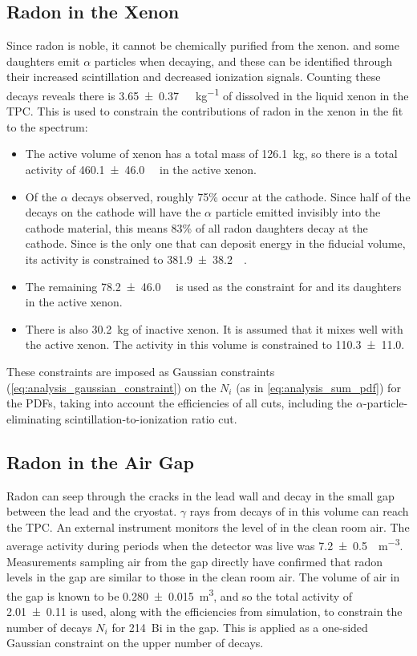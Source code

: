 \documentclass[herrin-thesis.tex]{subfiles}
\begin{document}
\subsection{Radon in the Xenon}
Since radon is noble, it cannot be chemically purified from the xenon.  and some daughters emit \(\alpha\) particles when decaying, and these can be identified through their increased scintillation and decreased ionization signals. Counting these decays reveals there is \SI{3.65\pm0.37}{\micro\Bq\per\kg} of  dissolved in the liquid xenon in the TPC. This is used to constrain the contributions of radon in the xenon in the fit to the spectrum:
\begin{itemize}
\item The active volume of xenon has a total mass of \SI{126.1}{\kg}, so there is a total activity of \SI{460.1\pm46.0}{\micro\Bq} in the active xenon.
\item Of the  \(\alpha\) decays observed, roughly 75\% occur at the cathode. Since half of the decays on the cathode will have the \(\alpha\) particle emitted invisibly into the cathode material, this means 83\% of all radon daughters decay at the cathode. Since  is the only one that can deposit energy in the fiducial volume, its activity is constrained to \SI{381.9\pm38.2}{\micro\Bq}.
\item The remaining \SI{78.2\pm46.0}{\micro\Bq} is used as the constraint for  and its daughters in the active xenon.
\item There is also \SI{30.2}{\kg} of inactive xenon. It is assumed that it mixes well with the active xenon. The activity in this volume is constrained to \SI{110.3\pm11.0}{\Bq}.
\end{itemize}
These constraints are imposed as Gaussian constraints (\cref{eq:analysis_gaussian_constraint}) on the \(N_i\) (as in \cref{eq:analysis_sum_pdf}) for the PDFs, taking into account the efficiencies of all cuts, including the \(\alpha\)-particle-eliminating scintillation-to-ionization ratio cut.

\subsection{Radon in the Air Gap}
Radon can seep through the cracks in the lead wall and decay in the small gap between the lead and the cryostat. \(\gamma\) rays from decays of  in this volume can reach the TPC. An external instrument \cite{rad7} monitors the level of  in the clean room air. The average activity during periods when the detector was live was \SI{7.2\pm0.5}{\Bq\per\cubic\meter}. Measurements sampling air from the gap directly have confirmed that radon levels in the gap are similar to those in the clean room air. The volume of air in the gap is known to be \SI{.280\pm0.015}{\cubic\meter}, and so the total activity of \SI{2.01\pm 0.11}{\Bq} is used, along with the efficiencies from simulation, to constrain the number of decays \(N_i\) for \SI{214}{Bi} in the gap. This is applied as a one-sided Gaussian constraint on the upper number of decays.
\end{document}
